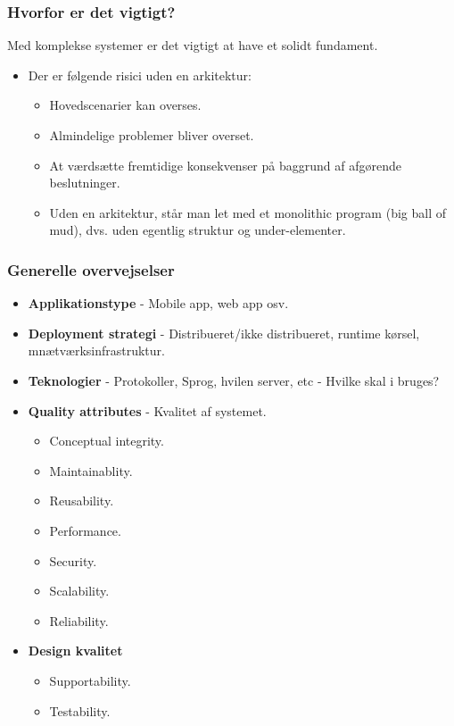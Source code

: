 \subsubsection{Hvorfor er det vigtigt?}
Med komplekse systemer er det vigtigt at have et solidt fundament.

\begin{itemize}
	\item Der er følgende risici uden en arkitektur:
	\begin{itemize}
		\item Hovedscenarier kan overses.
		\item Almindelige problemer bliver overset.
		\item At værdsætte fremtidige konsekvenser på baggrund af afgørende beslutninger.
		\item Uden en arkitektur, står man let med et monolithic program (big ball of mud), dvs. uden egentlig struktur og under-elementer.
	\end{itemize}
\end{itemize}

\subsubsection{Generelle overvejselser}
\begin{itemize}
	\item \textbf{Applikationstype} - Mobile app, web app osv.
	\item \textbf{Deployment strategi} - Distribueret/ikke distribueret, runtime kørsel, mnætværksinfrastruktur.
	\item \textbf{Teknologier} - Protokoller, Sprog, hvilen server, etc - Hvilke skal i bruges?
	\item \textbf{Quality attributes} - Kvalitet af systemet.
	\begin{itemize}
		\item Conceptual integrity.
		\item Maintainablity.
		\item Reusability.
		\item Performance.
		\item Security.
		\item Scalability.
		\item Reliability.
	\end{itemize}
	\item \textbf{Design kvalitet}
	\begin{itemize}
		\item Supportability.
		\item Testability.
	\end{itemize}
\end{itemize}


